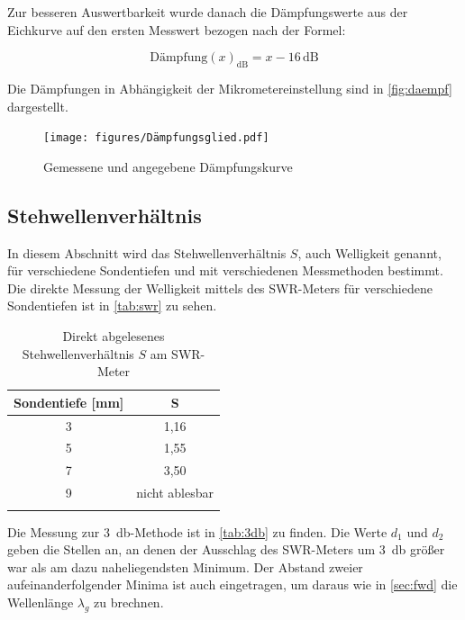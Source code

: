 Zur besseren Auswertbarkeit wurde danach die Dämpfungswerte aus der Eichkurve auf den ersten Messwert bezogen nach der Formel:

\begin{equation}
\text{Dämpfung}(x)_{\text{dB}} = x - 16\,\text{dB}
\label{eq:daempf}
\end{equation}

Die Dämpfungen in Abhängigkeit der Mikrometereinstellung sind in \autoref{fig:daempf} dargestellt.



\begin{figure}
\texttt{[image: figures/Dämpfungsglied.pdf]}
\caption{Gemessene und angegebene Dämpfungskurve}
\label{fig:daempf}
\end{figure}










\subsection{Stehwellenverhältnis}
\label{sec:welligkeit}


In diesem Abschnitt wird das Stehwellenverhältnis $S$, auch Welligkeit genannt, für verschiedene Sondentiefen und mit verschiedenen Messmethoden bestimmt.
Die direkte Messung der Welligkeit mittels des SWR-Meters für verschiedene Sondentiefen ist in \autoref{tab:swr} zu sehen.


\begin{table}
\centering
\caption{Direkt abgelesenes Stehwellenverhältnis $S$ am SWR-Meter}
\begin{tabular}{c c}
\toprule
{Sondentiefe [mm]} & {S}\\
\midrule
3&1,16\\
5&1,55\\
7&3,50\\
9&nicht ablesbar\\
\bottomrule
\label{tab:swr}
\end{tabular}
\end{table}


Die Messung zur \SI{3}{\decibel}-Methode ist in \autoref{tab:3db} zu finden. Die Werte $d_1$ und $d_2$ geben die Stellen an, an denen der Ausschlag des SWR-Meters um \SI{3}{\decibel}  größer war als am dazu naheliegendsten Minimum. Der Abstand zweier aufeinanderfolgender Minima ist auch eingetragen, um daraus wie in \autoref{sec:fwd} die Wellenlänge $\lambda_g$ zu brechnen.



